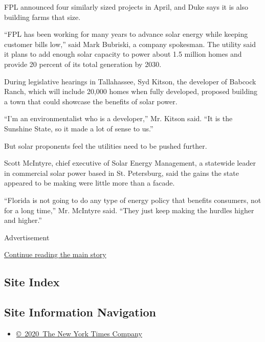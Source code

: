 FPL announced four similarly sized projects in April, and Duke says it
is also building farms that size.

``FPL has been working for many years to advance solar energy while
keeping customer bills low,'' said Mark Bubriski, a company spokesman.
The utility said it plans to add enough solar capacity to power about
1.5 million homes and provide 20 percent of its total generation by
2030.

During legislative hearings in Tallahassee, Syd Kitson, the developer of
Babcock Ranch, which will include 20,000 homes when fully developed,
proposed building a town that could showcase the benefits of solar
power.

``I'm an environmentalist who is a developer,'' Mr. Kitson said. ``It is
the Sunshine State, so it made a lot of sense to us.''

But solar proponents feel the utilities need to be pushed further.

Scott McIntyre, chief executive of Solar Energy Management, a statewide
leader in commercial solar power based in St. Petersburg, said the gains
the state appeared to be making were little more than a facade.

``Florida is not going to do any type of energy policy that benefits
consumers, not for a long time,'' Mr. McIntyre said. ``They just keep
making the hurdles higher and higher.''

Advertisement

\protect\hyperlink{after-bottom}{Continue reading the main story}

\hypertarget{site-index}{%
\subsection{Site Index}\label{site-index}}

\hypertarget{site-information-navigation}{%
\subsection{Site Information
Navigation}\label{site-information-navigation}}

\begin{itemize}
\tightlist
\item
  \href{https://help.nytimes3xbfgragh.onion/hc/en-us/articles/115014792127-Copyright-notice}{©~2020~The
  New York Times Company}
\end{itemize}

